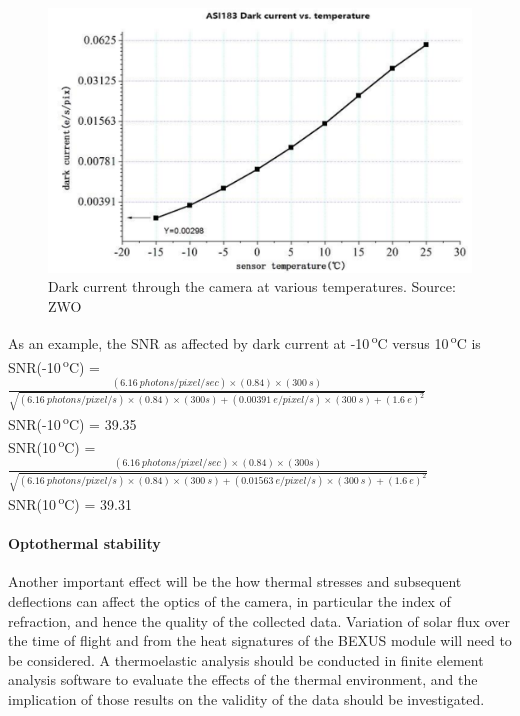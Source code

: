	\begin{figure}[h!]
    \centering
    \includegraphics[scale=0.8]{4-experiment-design/img/mechanical/darkcurrent.png}
    	\caption{Dark current through the camera at various temperatures. Source: ZWO}
	\label{fig:darkcurrent}
	\end{figure}

As an example, the SNR as affected by dark current at -10\,\textsuperscript{o}C versus 10\,\textsuperscript{o}C is\\

 SNR(-10\,\textsuperscript{o}C) =  $\frac{(\SI{6.16}{photons \per pixel \per sec})\times (0.84)\times (\SI{300}{s})}{\sqrt{(\SI{6.16}{photons \per pixel \per s})\times (0.84)\times (300s)+(\SI{0.00391}{e \per pixel \per s})\times (\SI{300}{s})+(\SI{1.6}{e})^2}}$ \\

 SNR(-10\,\textsuperscript{o}C) = 39.35\\

 SNR(10\,\textsuperscript{o}C) =  $\frac{(\SI{6.16}{photons \per pixel \per sec})\times (0.84)\times (300s)}{\sqrt{(\SI{6.16}{photons \per pixel \per s})\times (0.84)\times (\SI{300}{s})+(\SI{0.01563}{e \per pixel \per s})\times (\SI{300}{s})+(\SI{1.6}{e})^2}}$ \\

 SNR(10\,\textsuperscript{o}C) = 39.31\\


\paragraph{Optothermal stability}
Another important effect will be the how thermal stresses and subsequent deflections can affect the optics of the camera, in particular the index of refraction, and hence the quality of the collected data. Variation of solar flux over the time of flight and from the heat signatures of the BEXUS module will need to be considered. A thermoelastic analysis should be conducted in finite element analysis software to evaluate the effects of the thermal environment, and the implication of those results on the validity of the data should be investigated. \

